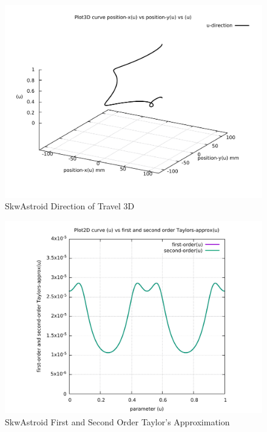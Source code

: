 \begin{figure}
	\caption     {SkwAstroid Direction of Travel 3D}
	\label{04-img-SkwAstroid Direction of Travel 3D.pdf}
	\includegraphics[width=1.00\textwidth]{Chap4/appendix/app-SkwAstroid/plots/04-img-SkwAstroid Direction of Travel 3D.pdf}
\end{figure}

\clearpage
\pagebreak

\begin{figure}
	\caption     {SkwAstroid First and Second Order Taylor's Approximation}
	\label{05-img-SkwAstroid-First-and-Second-Order-Taylors-Approx.pdf}
	\includegraphics[width=1.00\textwidth]{Chap4/appendix/app-SkwAstroid/plots/05-img-SkwAstroid-First-and-Second-Order-Taylors-Approx.pdf}
\end{figure}


